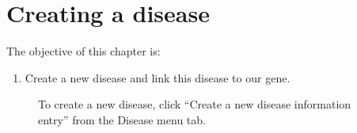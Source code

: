 \chapter{Creating a disease}
The objective of this chapter is:
\begin{enumerate}
	\item 
	Create a new disease and link this disease to our gene.
\end{enumerate}

\begin{figure}[ht]
  \begin{shaded}
		\caption{To create a new disease, click ``Create a new disease information entry'' from the Disease menu tab.}
		\label{fig:create_disease_PHARC_I}
  \end{shaded}
\end{figure}

